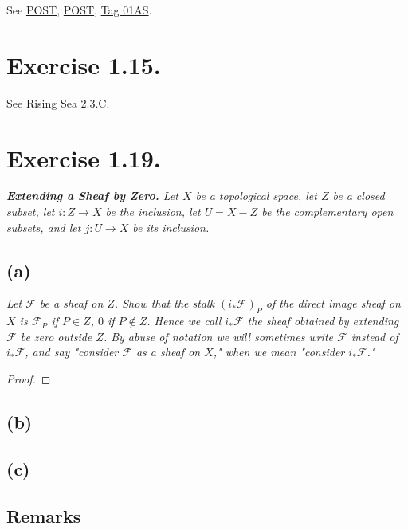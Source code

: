 See \href{https://math.stackexchange.com/questions/2080018/prove-that-the-support-of-a-section-of-a-sheaf-is-a-closed-set}{POST}, \href{https://math.stackexchange.com/questions/2418007/the-support-of-a-sheaf-is-not-necessarily-closed#:~:text=Then%20we%20have%20Su,not%20closed%20in%20Zariski%20topology.}{POST}, \href{https://stacks.math.columbia.edu/tag/01AS}{Tag 01AS}.

\section{Exercise 1.15.}

See Rising Sea 2.3.C.

\section{Exercise 1.19.}\label{Hart Chap 2 Ex 1.19.}

\textit{\textbf{Extending a Sheaf by Zero.} Let $X$ be a topological space, let $Z$ be a closed subset, let $i:Z\to X$ be the inclusion, let $U=X-Z$ be the complementary open subsets, and let $j:U\to X$ be its inclusion.}

\subsection{(a)}
\textit{Let $\mathscr F$ be a sheaf on $Z$. Show that the stalk $(i_{\ast}\mathscr F)_P$ of the direct image sheaf on $X$ is $\mathscr F_P$ if $P\in Z$, $0$ if $P\notin Z$. Hence we call $i_{\ast}\mathscr F$ the sheaf obtained by extending $\mathscr F$ be zero outside $Z$. By abuse of notation we will sometimes write $\mathscr F$ instead of $i_{\ast}\mathscr F$, and say "consider $\mathscr F$ as a sheaf on $X$," when we mean "consider $i_{\ast}\mathscr F$."}
\begin{proof}
    
\end{proof}

\subsection{(b)}


\subsection{(c)}

\subsection{Remarks}

